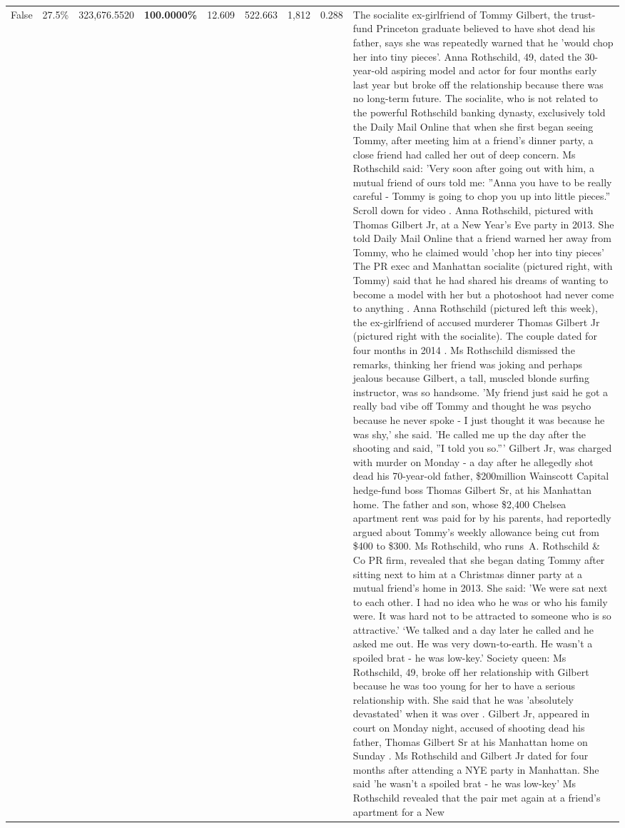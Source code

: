 \begin{table}[H]
\begin{tabular}{lllrlllll}
False & 27.5\% & 323,676.5520 & \bfseries \color{red} 100.0000\% & 12.609 & 522.663 & 1,812 & 0.288 & The socialite ex-girlfriend of Tommy Gilbert, the trust-fund Princeton graduate believed to have shot dead his father, says she was repeatedly warned that he 'would chop her into tiny pieces'. Anna Rothschild, 49, dated the 30-year-old aspiring model and actor for four months early last year but broke off the relationship because there was no long-term future. The socialite, who is not related to the powerful Rothschild banking dynasty, exclusively told the Daily Mail Online that when she first began seeing Tommy, after meeting him at a friend's dinner party, a close friend had called her out of deep concern. Ms Rothschild said: 'Very soon after going out with him, a mutual friend of ours told me: ''Anna you have to be really careful - Tommy is going to chop you up into little pieces.'' Scroll down for video . Anna Rothschild, pictured with Thomas Gilbert Jr, at a New Year's Eve party in 2013. She told Daily Mail Online that a friend warned her away from Tommy, who he claimed would 'chop her into tiny pieces' The PR exec and Manhattan socialite (pictured right, with Tommy) said that he had shared his dreams of wanting to become a model with her but a photoshoot had never come to anything . Anna Rothschild (pictured left this week), the ex-girlfriend of accused murderer Thomas Gilbert Jr (pictured right with the socialite). The couple dated for four months in 2014 . Ms Rothschild dismissed the remarks, thinking her friend was joking and perhaps jealous because Gilbert, a tall, muscled blonde surfing instructor, was so handsome. 'My friend just said he got a really bad vibe off Tommy and thought he was psycho because he never spoke - I just thought it was because he was shy,' she said. 'He called me up the day after the shooting and said, ''I told you so.''' Gilbert Jr, was charged with murder on Monday - a day after he allegedly shot dead his 70-year-old father, \$200million Wainscott Capital hedge-fund boss Thomas Gilbert Sr, at his Manhattan home. The father and son, whose \$2,400 Chelsea apartment rent was paid for by his parents, had reportedly argued about Tommy's weekly allowance being cut from \$400 to \$300. Ms Rothschild, who runs A. Rothschild \& Co PR firm, revealed that she began dating Tommy after sitting next to him at a Christmas dinner party at a mutual friend's home in 2013. She said: 'We were sat next to each other. I had no idea who he was or who his family were. It was hard not to be attracted to someone who is so attractive.' ‘We talked and a day later he called and he asked me out. He was very down-to-earth. He wasn’t a spoiled brat - he was low-key.’ Society queen: Ms Rothschild, 49, broke off her relationship with Gilbert because he was too young for her to have a serious relationship with. She said that he was 'absolutely devastated' when it was over . Gilbert Jr, appeared in court on Monday night, accused of shooting dead his father, Thomas Gilbert Sr at his Manhattan home on Sunday . Ms Rothschild and Gilbert Jr dated for four months after attending a NYE party in Manhattan. She said 'he wasn't a spoiled brat - he was low-key' Ms Rothschild revealed that the pair met again at a friend’s apartment for a New 
\end{tabular}
\end{table}
